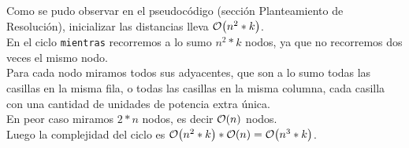 \documentclass[11pt, a4paper, twoside]{article}
\begin{document}
{}

Como se pudo observar en el pseudocódigo (sección Planteamiento de Resolución), inicializar las distancias 
lleva $\mathop{}\mathopen{}\mathcal{O}\mathopen{}\left(n^2 * k\right)$.\\
En el ciclo \texttt{mientras} recorremos a lo sumo $n^2 * k$ nodos, ya que no recorremos dos veces el mismo nodo.\\
Para cada nodo miramos todos sus adyacentes, que son a lo sumo todas las casillas en la misma fila, o todas
las casillas en la misma columna, cada casilla con una cantidad de unidades de potencia extra única. \\
En peor caso miramos $2*n$ nodos, es decir $\mathop{}\mathopen{}\mathcal{O}\mathopen{}\left(n\right)$ nodos.\\
Luego la complejidad del ciclo es $\mathop{}\mathopen{}\mathcal{O}\mathopen{}\left(n^2 * k\right) * \mathop{}\mathopen{}\mathcal{O}\mathopen{}\left(n\right) = \mathop{}\mathopen{}\mathcal{O}\mathopen{}\left(n^3 * k\right)$.\\
\end{document}
